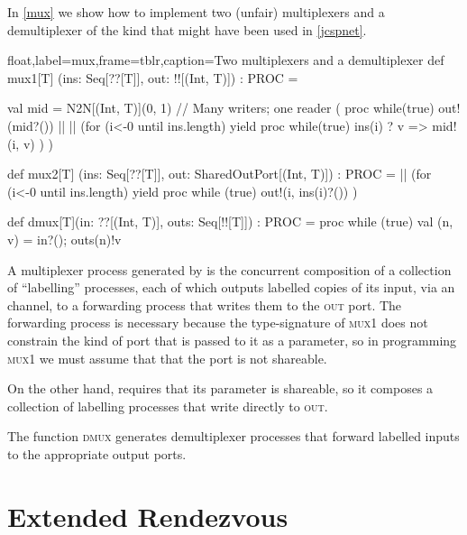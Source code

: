 \documentclass[12pt]{IOS-Book-Article-CPA-2017}
\begin{document}
In \Listing \ref{mux}  we show how to implement two (unfair) 
multiplexers and a demultiplexer of the kind that might have
been used in \Listing \ref{jcspnet}.

\begin{code+}[...]{float,label=mux,frame=tblr,caption={Two multiplexers and a demultiplexer}}
  def mux1[T] (ins: Seq[??[T]], out: !![(Int, T)]) : PROC =
  { val mid = N2N[(Int, T)](0, 1) // Many writers; one reader
    (  proc { while(true) { out!(mid?()) } } ||
    || (for (i<-0 until ins.length) yield 
            proc { while(true) ins(i) ? { v => mid!(i, v)} })
    )
    
  }   
   
  def mux2[T] (ins: Seq[??[T]], out: SharedOutPort[(Int, T)]) : PROC =
      || (for (i<-0 until ins.length) yield 
              proc { while (true) {out!(i, ins(i)?())} })   

  def dmux[T](in:  ??[(Int, T)], outs: Seq[!![T]]) : PROC = proc { 
    while (true) { val (n, v) = in?(); outs(n)!v  } 
  }
\end{code+}

A multiplexer process generated by  is the concurrent composition 
of a collection of ``labelling'' processes, each of which outputs labelled copies of its
input, via an  channel, to a forwarding process that
writes them to the \textsc{out} port. The forwarding process is necessary
because the type-signature of \textsc{mux1} does not constrain the
kind of port that is passed to it as a parameter, so in programming \textsc{mux1}
we must assume that that the port is not shareable.

On the other hand,  requires that its  
parameter is shareable, so it composes a collection of labelling processes that
write directly to \textsc{out}.

The function \textsc{dmux} generates demultiplexer processes that forward
labelled inputs to the appropriate output ports.



\section{Extended Rendezvous} 
\end{document}
